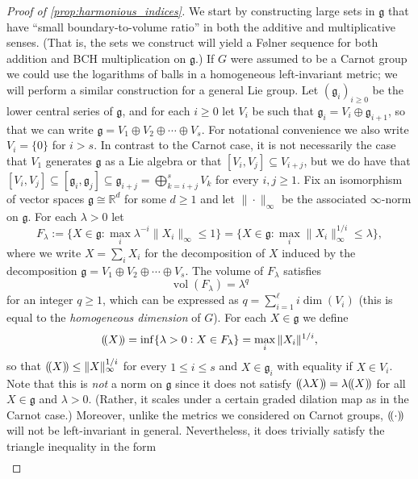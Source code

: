 \documentclass[11pt]{article}
\numberwithin{equation}{section}
\theoremstyle{plain}
\theoremstyle{definition}
\theoremstyle{remark}
\numberwithin{equation}{section}
\newcommand{\R}{\mathbb R}
\newcommand{\Vol}{\operatorname{vol}}
\numberwithin{equation}{section}
\DeclarePairedDelimiter\pnorm{(\!(}{)\!)}
\begin{document}
\begin{proof}[Proof of \cref{prop:harmonious_indices}]
%
%
%
%
%
%
%
%
%
%
%
%
%
%
%
%
%
We start by constructing large sets in $\mathfrak{g}$ that have ``small boundary-to-volume ratio'' in both the additive and multiplicative senses. (That is, the sets we construct will yield a F{\o}lner sequence for both addition and BCH multiplication on $\mathfrak{g}$.)  If $G$ were assumed to be a Carnot group we could use the logarithms of balls in a homogeneous left-invariant metric; we will perform a similar construction for a general Lie group. Let $(\mathfrak{g}_i)_{i\geq 0}$ be the lower central series of $\mathfrak{g}$, and for each $i\geq 0$ let $V_i$ be such that $\mathfrak{g}_i = V_i \oplus \mathfrak{g}_{i+1}$, so that we can write $\mathfrak{g}=V_1 \oplus V_2 \oplus \cdots \oplus V_s$. For notational convenience we also write $V_i=\{0\}$ for $i>s$. In contrast to the Carnot case, it is not necessarily the case that $V_1$ generates $\mathfrak{g}$ as a Lie algebra or that $[V_i,V_j]\subseteq V_{i+j}$, but we do have that $[V_{i},V_j] \subseteq [\mathfrak{g}_i,\mathfrak{g}_j] \subseteq \mathfrak{g}_{i+j} =  \bigoplus_{k = i+j}^sV_{k}$ for every $i,j \geq 1$.
Fix an isomorphism of vector spaces $\mathfrak{g} \cong \R^d$ for some $d\geq 1$ and let $\|\cdot \|_\infty$ be the associated $\infty$-norm on $\mathfrak{g}$. For each $\lambda>0$ let
\[
F_\lambda := \{X\in \mathfrak{g}: \max_i \lambda^{-i}\|X_i\|_\infty \leq 1\}=\{X\in \mathfrak{g}: \max_i \|X_i\|_\infty^{1/i} \leq \lambda\},
\]
where we write $X=\sum_i X_i$ for the decomposition of $X$ induced by the decomposition $\mathfrak{g}=V_1 \oplus V_2 \oplus \cdots \oplus V_s$. The volume of $F_\lambda$ satisfies
\[\Vol (F_\lambda)=\lambda^q\] for an integer $q\geq 1$, which can be expressed as $q=\sum_{i=1}^\ell i \dim(V_i)$ (this is equal to the \emph{homogeneous dimension} of $G$). For each $X\in \mathfrak{g}$ we define
\[
\pnorm{X}=\inf \{\lambda>0: X\in F_\lambda\} = \max_i \|X_i\|^{1/i},
\]
so that $\pnorm{X} \leq \|X\|_\infty^{1/i}$ for every $1\leq i \leq s$ and $X \in \mathfrak{g}_i$ with equality if $X\in V_i$.
Note that this is \emph{not} a norm on $\mathfrak{g}$ since it does not satisfy $\pnorm{\lambda X}=\lambda \pnorm{X}$ for all $X\in \mathfrak{g}$ and $\lambda>0$. (Rather, it scales under a certain graded dilation map as in the Carnot case.) Moreover, unlike the metrics we considered on Carnot groups, $\pnorm{\cdot}$ will not be left-invariant in general. Nevertheless, it does trivially satisfy the triangle inequality in the form
\begin{multline}\label{eq:pnorm_triangle}

\end{multline}
\end{proof}
\end{document}
